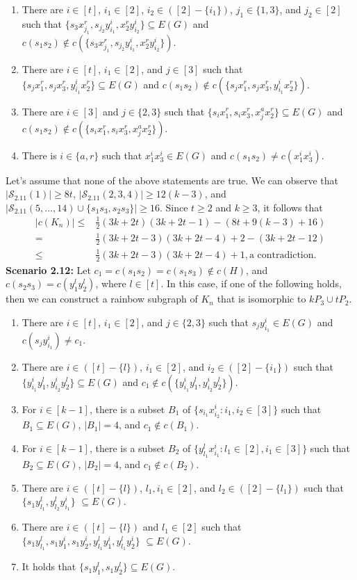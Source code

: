\documentclass[12pt]{article}
\begin{document}
\begin{enumerate}
     \item There are $i\in[t]$, $i_1\in[2]$, $i_2\in([2]-\{i_1\})$, $j_1\in\{1,3\}$, and $j_2\in[2]$ such that  $\{s_3x^r_{j_1},s_{j_2}y^i_{i_1},x^r_2y^i_{i_2}\}\subseteq E(G)$ and $c(s_1s_2)\not\in c(\{s_3x^r_{j_1},s_{j_2}y^i_{i_1},x^r_2y^i_{i_2}\})$.
      \item There are $i\in[t]$, $i_1\in[2]$, and $j\in[3]$ such that  $\{s_jx^r_1,s_jx^r_3,y^i_{i_1}x^r_2\}\subseteq E(G)$ and $c(s_1s_2)\not\in c(\{s_jx^r_1,s_jx^r_3,y^i_{i_1}x^r_2\})$.
      \item There are $i\in[3]$ and $j\in\{2,3\}$ such that $\{s_ix^r_1,s_ix^r_3,x^a_jx^r_2\}\subseteq E(G)$ and $c(s_1s_2)\not\in c(\{s_ix^r_1,s_ix^r_3,x^a_jx^r_2\})$.
      \item There is $i\in\{a,r\}$ such that $x^i_1x^i_3\in E(G)$ and $c(s_1s_2)\neq c(x^i_1x^i_3)$.
 \end{enumerate}
 Let’s assume that none of the above statements are true. We can observe that \( |\mathcal{S}_{2.11}(1)| \geq 8t \), \( |\mathcal{S}_{2.11}(2,3,4)| \geq 12(k - 3) \), and \( |\mathcal{S}_{2.11}(5,\ldots,14) \cup \{s_1s_3, s_2s_3\}| \geq 16 \). Since \( t \geq 2 \) and \( k \geq 3 \), it follows that
  \begin{align*}
  |c(K_n)|\leq & \frac{1}{2}(3k+2t)(3k+2t-1)-(8t+9(k-3)+16)\\
  =&\frac{1}{2}(3k+2t-3)(3k+2t-4)+2-(3k+2t-12)\\
  \leq &\frac{1}{2}(3k+2t-3)(3k+2t-4)+1,\text{a contradiction}.
\end{align*}
 {\bf Scenario 2.12:} Let \(c_1=c(s_1s_2)=c(s_1s_3) \notin c(H)\), and \( c(s_2s_3) = c(y^l_1y^l_2)\), where \(l \in [t]\).
 In this case, if one of the following holds, then we can construct a rainbow subgraph of \(K_n\) that is isomorphic to \(kP_3 \cup tP_2\).
 \begin{enumerate}
 \item There are $i\in[t]$, $i_1\in[2]$, and $j\in\{2,3\}$ such that $s_jy^i_{i_1}\in E(G)$ and $c(s_jy^i_{i_1})\neq c_1$.
 \item There are $i\in([t]-\{l\})$, $i_1\in[2]$, and $i_2\in([2]-\{i_1\})$ such that $\{y^i_{i_1}y^l_1,y^i_{i_2}y^l_2\}\subseteq E(G)$ and $c_1\not\in c(\{y^i_{i_1}y^l_1,y^i_{i_2}y^l_2\})$.
  \item For $i\in[k-1]$, there is a subset $B_1$ of $\{s_{i_1}x^i_{i_2}:i_1,i_2\in[3]\}$ such that $B_1\subseteq E(G)$, $|B_1|=4$, and $c_1\not\in c(B_1)$.
   \item For $i\in[k-1]$, there is a subset $B_2$ of $\{y^l_{l_1}x^i_{i_1}:l_1\in[2],i_1\in[3]\}$ such that $B_2\subseteq E(G)$, $|B_2|=4$, and $c_1\not\in c(B_2)$.
   \item There are $i\in([t]-\{l\})$, $l_1,i_1\in[2]$, and $l_2\in([2]-\{l_1\})$ such that $\{s_1y^l_{l_1},y^l_{l_2}y^i_{i_1}\}$ $\subseteq E(G)$.
   \item There are $i\in([t]-\{l\})$ and $l_1\in[2]$ such that $\{s_1y^l_{l_1},s_1y^i_{1},s_1y^i_2,y^l_{l_1}y^i_1,y^l_{l_1}y^i_2\}$ $\subseteq E(G)$.
    \item It holds that $\{s_1y^l_1,s_1y^l_2\}\subseteq E(G)$. 
 \end{enumerate}
\end{document}
